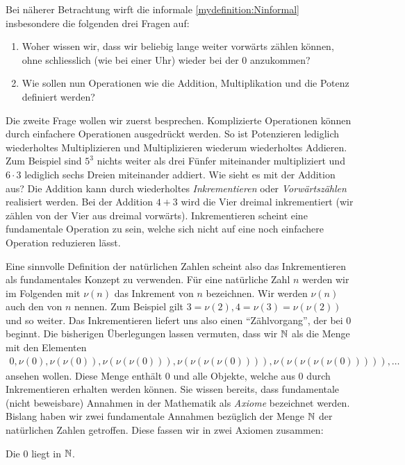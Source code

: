 Bei näherer Betrachtung wirft die informale \cref{mydefinition:Ninformal} insbesondere die folgenden drei Fragen auf:
\begin{enumerate}
	\item Woher wissen wir, dass wir beliebig lange weiter vorwärts zählen können, ohne schliesslich (wie bei einer Uhr) wieder bei der $0$ anzukommen?
	\item Wie sollen nun Operationen wie die Addition, Multiplikation und die Potenz definiert werden?
\end{enumerate}
Die zweite Frage wollen wir zuerst besprechen. Komplizierte Operationen können durch einfachere Operationen ausgedrückt werden. So ist Potenzieren lediglich wiederholtes Multiplizieren und Multiplizieren wiederum wiederholtes Addieren. Zum Beispiel sind $5^3$ nichts weiter als drei Fünfer miteinander multipliziert und $6\cdot 3$ lediglich sechs Dreien miteinander addiert. Wie sieht es mit der Addition aus? Die Addition kann durch wiederholtes \textit{Inkrementieren} oder \textit{Vorwärtszählen} realisiert werden. Bei der Addition $4+3$ wird die Vier dreimal inkrementiert (wir zählen von der Vier aus dreimal vorwärts). Inkrementieren scheint eine fundamentale Operation zu sein, welche sich nicht auf eine noch einfachere Operation reduzieren lässt.

Eine sinnvolle Definition der natürlichen Zahlen scheint also das Inkrementieren als fundamentales Konzept zu verwenden. Für eine natürliche Zahl $n$ werden wir im Folgenden mit $\nu(n)$ das Inkrement von $n$ bezeichnen. Wir werden $\nu(n)$ auch den  von $n$ nennen. Zum Beispiel gilt $3=\nu(2), 4 = \nu(3) = \nu(\nu(2))$ und so weiter. Das Inkrementieren liefert uns also einen \enquote{Zählvorgang}, der bei 0 beginnt. Die bisherigen Überlegungen lassen vermuten, dass wir $\mathbb{N}$ als die Menge mit den Elementen
\begin{align*}
	0, \nu(0), \nu(\nu(0)), \nu(\nu(\nu(0))), \nu(\nu(\nu(\nu(0)))), \nu(\nu(\nu(\nu(\nu(0))))), \ldots
\end{align*}
ansehen wollen. Diese Menge enthält $0$ und alle Objekte, welche aus $0$ durch Inkrementieren erhalten werden können. Sie wissen bereits, dass fundamentale (nicht beweisbare) Annahmen in der Mathematik als \textit{Axiome} bezeichnet werden. Bislang haben wir zwei fundamentale Annahmen bezüglich der Menge $\mathbb{N}$ der natürlichen Zahlen getroffen. Diese fassen wir in zwei Axiomen zusammen:
\begin{myaxiom}\label{myaxiom:a1}
	Die $0$ liegt in $\mathbb{N}$.
\end{myaxiom}

